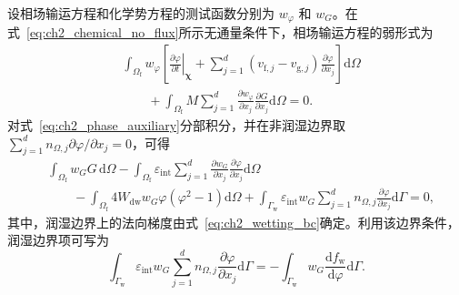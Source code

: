 设相场输运方程和化学势方程的测试函数分别为 $w_{\varphi}$ 和 $w_G$。在式~\eqref{eq:ch2_chemical_no_flux}所示无通量条件下，相场输运方程的弱形式为
\begin{equation}
\begin{aligned}
&\int_{\Omega_{\mathrm f}}
w_{\varphi}
\left[
\left.
\frac{\partial\varphi}{\partial t}
\right|_{\boldsymbol{\chi}}
+
\sum_{j=1}^{d}
\left(v_{\mathrm f,j}-v_{\mathrm g,j}\right)
\frac{\partial\varphi}{\partial x_j}
\right]
\mathrm d\Omega
\\
&\qquad+
\int_{\Omega_{\mathrm f}}
M
\sum_{j=1}^{d}
\frac{\partial w_{\varphi}}{\partial x_j}
\frac{\partial G}{\partial x_j}
\mathrm d\Omega
=0.
\end{aligned}
\label{eq:ch2_weak_phase_transport}
\end{equation}
对式~\eqref{eq:ch2_phase_auxiliary}分部积分，并在非润湿边界取 $\sum_{j=1}^{d}n_{\Omega,j}\partial\varphi/\partial x_j=0$，可得
\begin{equation}
\begin{aligned}
&\int_{\Omega_{\mathrm f}}
w_GG\,\mathrm d\Omega
-
\int_{\Omega_{\mathrm f}}
\varepsilon_{\mathrm{int}}
\sum_{j=1}^{d}
\frac{\partial w_G}{\partial x_j}
\frac{\partial\varphi}{\partial x_j}
\mathrm d\Omega
\\
&\qquad-
\int_{\Omega_{\mathrm f}}
4W_{\mathrm{dw}}
w_G\varphi\left(\varphi^2-1\right)
\mathrm d\Omega
+
\int_{\Gamma_{\mathrm w}}
\varepsilon_{\mathrm{int}}w_G
\sum_{j=1}^{d}
n_{\Omega,j}
\frac{\partial\varphi}{\partial x_j}
\mathrm d\Gamma
=0,
\end{aligned}
\label{eq:ch2_weak_phase_auxiliary}
\end{equation}
其中，润湿边界上的法向梯度由式~\eqref{eq:ch2_wetting_bc}确定。利用该边界条件，润湿边界项可写为
\begin{equation}
\int_{\Gamma_{\mathrm w}}
\varepsilon_{\mathrm{int}}w_G
\sum_{j=1}^{d}
n_{\Omega,j}
\frac{\partial\varphi}{\partial x_j}
\mathrm d\Gamma
=
-
\int_{\Gamma_{\mathrm w}}
w_G
\frac{\mathrm df_{\mathrm w}}{\mathrm d\varphi}
\mathrm d\Gamma.
\label{eq:ch2_weak_wetting_term}
\end{equation}

